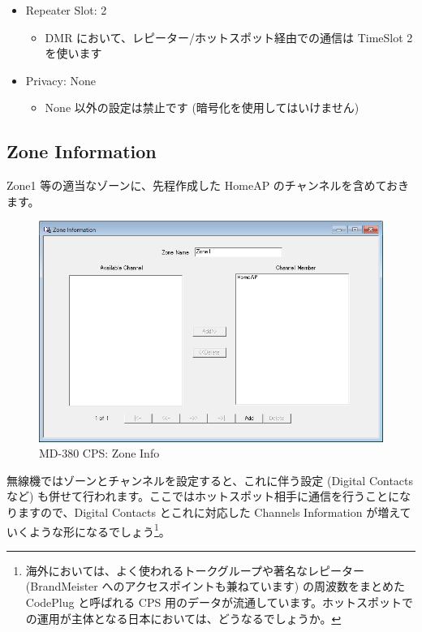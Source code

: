 \documentclass[a4j,oneside]{ujbook}
\begin{document}
\begin{itemize}
\begin{itemize}
  \item Repeater Slot: 2
  \begin{itemize}
   \renewcommand{\labelitemiii}{$\triangleright$}
   \item DMR において、レピーター/ホットスポット経由での通信は TimeSlot 2 を使います
  \end{itemize}
  \item Privacy: None
  \begin{itemize}
   \renewcommand{\labelitemiii}{$\triangleright$}
   \item None 以外の設定は禁止です (暗号化を使用してはいけません)
  \end{itemize}
 \end{itemize}
\end{itemize}

\subsection*{Zone Information}

Zone1 等の適当なゾーンに、先程作成した HomeAP のチャンネルを含めておきます。

\begin{figure}[H]
 \begin{center}
  \includegraphics[width=11.9cm]{img/md380cps-zoneinfo.png}
 \end{center}
 \caption{MD-380 CPS: Zone Info}
\end{figure}

無線機ではゾーンとチャンネルを設定すると、これに伴う設定 (Digital Contacts など) も併せて行われます。ここではホットスポット相手に通信を行うことになりますので、Digital Contacts とこれに対応した Channels Information が増えていくような形になるでしょう\footnote{海外においては、よく使われるトークグループや著名なレピーター (BrandMeister へのアクセスポイントも兼ねています) の周波数をまとめた CodePlug と呼ばれる CPS 用のデータが流通しています。ホットスポットでの運用が主体となる日本においては、どうなるでしょうか。}。
\end{document}
